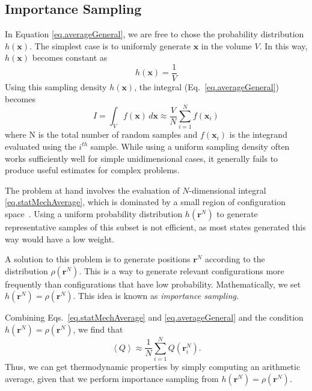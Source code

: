 \documentclass[aip,jcp,preprint,superscriptaddress,floatfix]{revtex4-1}
\begin{document}
\subsection{Importance Sampling}

In Equation \ref{eq.averageGeneral}, we are free to chose the probability
distribution
$h(\textbf{x})$. The simplest case is to uniformly generate $\textbf{x}$
in the volume $V$. In this way, $h(\textbf{x})$ becomes constant as
\begin{equation}
	h(\textbf{x}) = \frac{1}{V}
	\label{eq.uniformDist}
\end{equation}
Using this sampling density $h(\textbf{x})$, the integral (Eq.~\ref{eq.averageGeneral}) becomes
\begin{equation}
	I = \int_V f(\textbf{x}) \, d\textbf{x} \approx \frac{V}{N} \sum_{i=1}^N
	f(\textbf{x}_i)
	\label{eq.averageUniform}
\end{equation}
where N is the total number of random samples and $f(\textbf{x}_i)$ is the
integrand evaluated using the $i^{th}$ sample. While using a
uniform sampling density often works sufficiently well for simple unidimensional cases, it generally fails to produce useful estimates
for complex problems.

The problem at hand involves the evaluation of $N$-dimensional
integral \ref{eq.statMechAverage}, which is dominated by a small region of configuration space~\cite{Tuckerman.Book,Hill.Book,McQuarrie.Book}. 
Using a uniform probability distribution $h(\textbf{r}^N)$ to generate
representative samples of this subset is not efficient,
as most states generated this way would have a low weight.

A solution to this problem is to generate positions $\textbf{r}^N$ according to
the distribution $\rho\left(\textbf{r}^N\right)$. This is a way to generate
relevant configurations more frequently than configurations that have low
probability.
Mathematically, we set $h(\textbf{r}^N)=\rho\left(\textbf{r}^N\right)$.
This idea is known as \textit{importance sampling}.

Combining Eqs.~\ref{eq.statMechAverage} and \ref{eq.averageGeneral}
and the condition $h(\textbf{r}^N)=\rho\left(\textbf{r}^N\right)$,
we find that
\begin{equation}
	\left<Q\right> \approx \frac{1}{N} \sum_{i=1}^N Q\left(\textbf{r}_i^N\right) .
	\label{eq.importanceSamplingAverage}
\end{equation}
Thus, we can get thermodynamic properties by simply computing an arithmetic
average, given
that we perform importance sampling from $h(\textbf{r}^N)=\rho\left(\textbf{r}^N\right)$.
\end{document}
